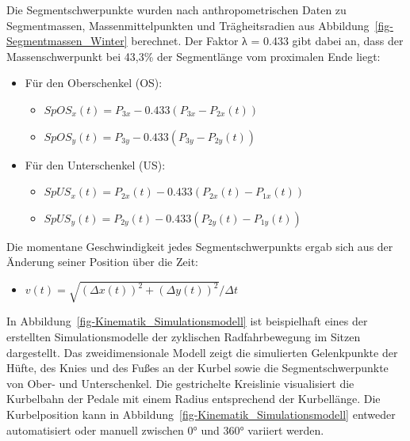 \documentclass[
  letterpaper,
  DIV=11]{scrartcl}
\providecommand{\tightlist}{%
  \setlength{\itemsep}{0pt}\setlength{\parskip}{0pt}}\usepackage{longtable,booktabs,array}
\begin{document}
Die Segmentschwerpunkte wurden nach anthropometrischen Daten zu
Segmentmassen, Massenmittelpunkten und Trägheitsradien aus
Abbildung~\ref{fig-Segmentmassen_Winter} berechnet. Der Faktor λ = 0.433
gibt dabei an, dass der Massenschwerpunkt bei 43,3\% der Segmentlänge
vom proximalen Ende liegt:

\begin{itemize}
\tightlist
\item
  Für den Oberschenkel (OS):

  \begin{itemize}
  \tightlist
  \item
    \(SpOS_x(t) = P_{3x} - 0.433(P_{3x} - P_{2x}(t))\)
  \item
    \(SpOS_y(t) = P_{3y} - 0.433(P_{3y} - P_{2y}(t))\)
  \end{itemize}
\item
  Für den Unterschenkel (US):

  \begin{itemize}
  \tightlist
  \item
    \(SpUS_x(t) = P_{2x}(t) - 0.433(P_{2x}(t) - P_{1x}(t))\)
  \item
    \(SpUS_y(t) = P_{2y}(t) - 0.433(P_{2y}(t) - P_{1y}(t))\)
  \end{itemize}
\end{itemize}

Die momentane Geschwindigkeit jedes Segmentschwerpunkts ergab sich aus
der Änderung seiner Position über die Zeit:

\begin{itemize}
\tightlist
\item
  \(v(t) = \sqrt{(\Delta x(t))^2 + (\Delta y(t))^2}/\Delta t\)
\end{itemize}

In Abbildung~\ref{fig-Kinematik_Simulationsmodell} ist beispielhaft
eines der erstellten Simulationsmodelle der zyklischen Radfahrbewegung
im Sitzen dargestellt. Das zweidimensionale Modell zeigt die simulierten
Gelenkpunkte der Hüfte, des Knies und des Fußes an der Kurbel sowie die
Segmentschwerpunkte von Ober- und Unterschenkel. Die gestrichelte
Kreislinie visualisiert die Kurbelbahn der Pedale mit einem Radius
entsprechend der Kurbellänge. Die Kurbelposition kann in
Abbildung~\ref{fig-Kinematik_Simulationsmodell} entweder automatisiert
oder manuell zwischen 0° und 360° variiert werden.
\end{document}
